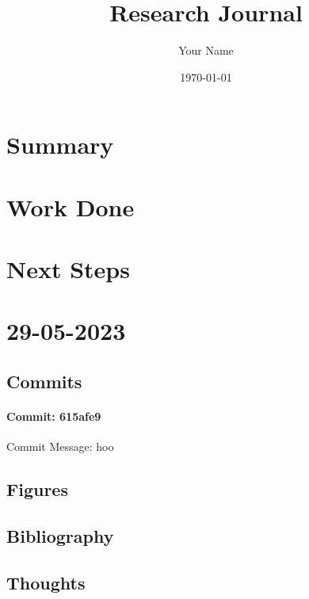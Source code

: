 \documentclass{article}
\begin{document}
\title{Research Journal}
\author{Your Name}
\date{\today}

\maketitle

\section{Summary}

\section{Work Done}

\section{Next Steps}




\section{29-05-2023}
\subsection{Commits}
\paragraph{Commit: 615afe9}
Commit Message: hoo

\subsection{Figures}
\subsection{Bibliography}
\subsection{Thoughts}
\end{document}
